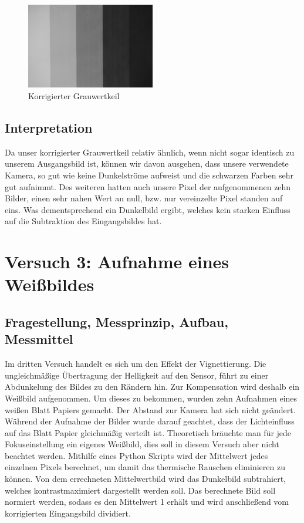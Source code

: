 \documentclass[12pt, oneside, a4paper, \docLanguage]{report}
\begin{document}
\begin{figure}[H]
	\centering\small
	\includegraphics[width=0.5\textwidth]{media/subGrayIntImage_versuch2.png}
	\caption{Korrigierter Grauwertkeil}
	\label{fig:VERSUCH_2_MESSWERTE_CORRECTED}
\end{figure}

\section{Interpretation}
\label{chap:VERSUCH_2_INTERPRETATION}
Da unser korrigierter Grauwertkeil relativ ähnlich, wenn nicht sogar identisch zu unserem Ausgangsbild ist, können wir davon ausgehen, dass unsere verwendete Kamera, so gut wie keine Dunkelströme aufweist und die schwarzen Farben sehr gut aufnimmt. Des weiteren hatten auch unsere Pixel der aufgenommenen zehn Bilder, einen sehr nahen Wert an null, bzw. nur vereinzelte Pixel standen auf eins. Was dementsprechend ein Dunkelbild ergibt, welches kein starken Einfluss auf die Subtraktion des Eingangsbildes hat.
%
%
\chapter{Versuch 3: Aufnahme eines Weißbildes}
\label{chap:VERSUCH_3}

\section{Fragestellung, Messprinzip, Aufbau, Messmittel}
\label{chap:VERSUCH_3_FRAGESTELLUNG}
Im dritten Versuch handelt es sich um den Effekt der Vignettierung. Die ungleichmäßige Übertragung der Helligkeit  auf den Sensor, führt zu einer Abdunkelung des Bildes zu den Rändern hin. Zur Kompensation wird deshalb ein Weißbild aufgenommen. Um dieses zu bekommen, wurden zehn Aufnahmen eines weißen Blatt Papiers gemacht. Der Abstand zur Kamera hat sich nicht geändert. Während der Aufnahme der Bilder wurde darauf geachtet, dass der Lichteinfluss auf das Blatt Papier gleichmäßig verteilt ist. Theoretisch bräuchte man für jede Fokuseinstellung ein eigenes Weißbild, dies soll in diesem Versuch aber nicht beachtet werden.
Mithilfe eines Python Skripts wird der Mittelwert jedes einzelnen Pixels berechnet, um damit das thermische Rauschen eliminieren zu können. Von dem errechneten Mittelwertbild wird das Dunkelbild subtrahiert, welches kontrastmaximiert dargestellt werden soll. Das berechnete Bild soll normiert werden, sodass es den Mittelwert 1 erhält und wird anschließend vom korrigierten Eingangsbild dividiert.
\newpage
\end{document}
